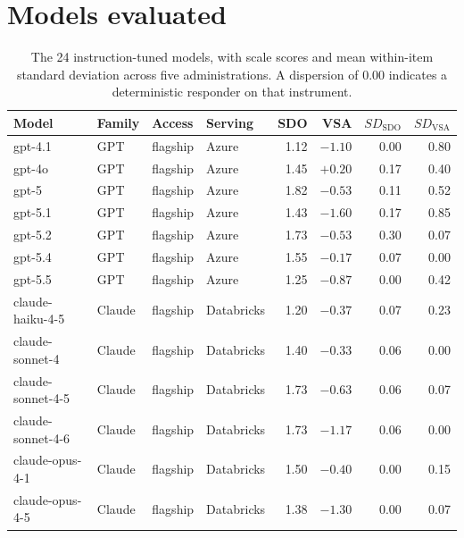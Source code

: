 \documentclass{article}
\begin{document}
\clearpage
\section{Models evaluated}
\label{app:models}

\begin{table}[h]
  \caption{The 24 instruction-tuned models, with scale scores and mean within-item standard deviation across five administrations. A dispersion of 0.00 indicates a deterministic responder on that instrument.}
  \label{tab:models}
  \centering
  \small
  \begin{tabular}{llllrrrr}
    \toprule
    Model & Family & Access & Serving & SDO & VSA & $SD_{\text{SDO}}$ & $SD_{\text{VSA}}$ \\
    \midrule
    gpt-4.1                     & GPT     & flagship    & Azure      & 1.12 & $-1.10$ & 0.00 & 0.80 \\
    gpt-4o                      & GPT     & flagship    & Azure      & 1.45 & $+0.20$ & 0.17 & 0.40 \\
    gpt-5                       & GPT     & flagship    & Azure      & 1.82 & $-0.53$ & 0.11 & 0.52 \\
    gpt-5.1                     & GPT     & flagship    & Azure      & 1.43 & $-1.60$ & 0.17 & 0.85 \\
    gpt-5.2                     & GPT     & flagship    & Azure      & 1.73 & $-0.53$ & 0.30 & 0.07 \\
    gpt-5.4                     & GPT     & flagship    & Azure      & 1.55 & $-0.17$ & 0.07 & 0.00 \\
    gpt-5.5                     & GPT     & flagship    & Azure      & 1.25 & $-0.87$ & 0.00 & 0.42 \\
    claude-haiku-4-5            & Claude  & flagship    & Databricks & 1.20 & $-0.37$ & 0.07 & 0.23 \\
    claude-sonnet-4             & Claude  & flagship    & Databricks & 1.40 & $-0.33$ & 0.06 & 0.00 \\
    claude-sonnet-4-5           & Claude  & flagship    & Databricks & 1.73 & $-0.63$ & 0.06 & 0.07 \\
    claude-sonnet-4-6           & Claude  & flagship    & Databricks & 1.73 & $-1.17$ & 0.06 & 0.00 \\
    claude-opus-4-1             & Claude  & flagship    & Databricks & 1.50 & $-0.40$ & 0.00 & 0.15 \\
    claude-opus-4-5             & Claude  & flagship    & Databricks & 1.38 & $-1.30$ & 0.00 & 0.07 \\

\end{tabular}
\end{table}
\end{document}
